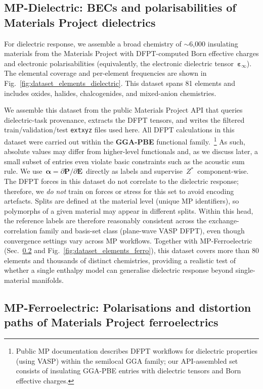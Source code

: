 \documentclass[aps,physrev,graphicx,amsmath,amssymb,
               reprint,superscriptaddress]{revtex4-2}
\begin{document}
\subsection{MP-Dielectric: BECs and polarisabilities of Materials Project dielectrics}
\label{sec:mp_dielectric}

For dielectric response, we assemble a broad chemistry of $\sim$6{,}000 insulating materials from the Materials Project with DFPT-computed Born effective charges and electronic polarisabilities (equivalently, the electronic dielectric tensor $\,\boldsymbol\varepsilon_\infty$). The elemental coverage and per-element frequencies are shown in Fig.~\ref{fig:dataset_elements_dielectric}. This dataset spans 81 elements and includes oxides, halides, chalcogenides, and mixed-anion chemistries.

We assemble this dataset from the public Materials Project API that queries dielectric-task provenance, extracts the DFPT tensors, and writes the filtered train/validation/test \texttt{extxyz} files used here. All DFPT calculations in this dataset were carried out within the \textbf{GGA-PBE} functional family.~\footnote{Public MP documentation describes DFPT workflows for dielectric properties (using VASP) within the semilocal GGA family; our API-assembled set consists of insulating GGA-PBE entries with dielectric tensors and Born effective charges.} As such, absolute values may differ from higher-level functionals and, as we discuss later, a small subset of entries even violate basic constraints such as the acoustic sum rule. We use $\,\boldsymbol\alpha=\partial \mathbf P/\partial \mathbf E\,$ directly as labels and supervise $\,Z^*\,$ component-wise. The DFPT forces in this dataset do not correlate to the dielectric response; therefore, we \emph{do not} train on forces or stress for this set to avoid encoding artefacts. Splits are defined at the material level (unique MP identifiers), so polymorphs of a given material may appear in different splits. Within this head, the reference labels are therefore reasonably consistent across the exchange-correlation family and basis-set class (plane-wave VASP DFPT), even though convergence settings vary across MP workflows. Together with MP-Ferroelectric (Sec.~\ref{sec:mp_ferroelectric} and Fig.~\ref{fig:dataset_elements_ferro}), this dataset covers more than 80 elements and thousands of distinct chemistries, providing a realistic test of whether a single enthalpy model can generalise dielectric response beyond single-material manifolds.

\subsection{MP-Ferroelectric: Polarisations and distortion paths of Materials Project ferroelectrics}
\label{sec:mp_ferroelectric}
\end{document}
